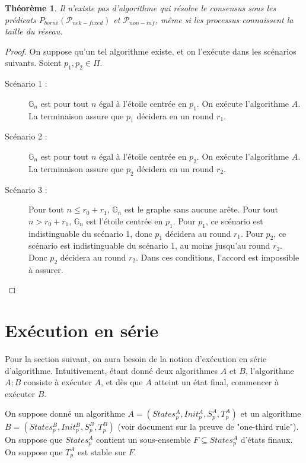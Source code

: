 \documentclass{article}
\newtheorem{theorem}{Théorème}
\begin{document}
\begin{theorem}
	Il n'existe pas d'algorithme qui résolve le consensus sous les prédicats $P_{borné}(\mathcal{P}_{nek-fixed})$ et $\mathcal{P}_{non-inf}$, même si les processus connaissent la taille du réseau.
\end{theorem}
\begin{proof}
	On suppose qu'un tel algorithme existe, et on l'exécute dans les scénarios suivants.
	Soient $p_1, p_2 \in \Pi$.
	\begin{description}

		\item[Scénario 1 :] $\mathds{G}_n$ est pour tout $n$ égal à l'étoile centrée en $p_1$. On exécute l'algorithme $A$. La terminaison assure que $p_1$ décidera en un round $r_1$.
		\item[Scénario 2 :] $\mathds{G}_n$ est pour tout $n$ égal à l'étoile centrée en $p_2$. On exécute l'algorithme $A$. La terminaison assure que $p_2$ décidera en un round $r_2$.
		\item[Scénario 3 :] Pour tout $n \leq r_0 + r_1$, $\mathds{G}_n$ est le graphe sans aucune arête. Pour tout $n > r_0 + r_1$, $\mathds{G}_n$ est l'étoile centrée en $p_1$.
			Pour $p_1$, ce scénario est indistinguable du scénario 1, donc $p_1$ décidera au round $r_1$.
			Pour $p_2$, ce scénario est indistinguable du scénario 1, au moins jusqu'au round $r_2$. Donc $p_2$ décidera au round $r_2$.
			Dans ces conditions, l'accord est impossible à assurer.

	\end{description}
\end{proof}

\section{Exécution en série}

Pour la section suivant, on aura besoin de la notion d'exécution en série d'algorithme.
Intuitivement, étant donné deux algorithmes $A$ et $B$, l'algorithme $A;B$ consiste à exécuter $A$, et dès que $A$ atteint un état final, commencer à exécuter $B$.

On suppose donné un algorithme $A = (States_p^A, Init_p^A, S_p^A, T_p^A)$ et un algorithme $B = (States_p^B, Init_p^B, S_p^B, T_p^B)$ (voir document sur la preuve de "one-third rule").
On suppose que $States_p^A$ contient un sous-ensemble $F \subseteq States_p^A$ d'états finaux. On suppose que $T_p^A$ est stable sur $F$.
\end{document}
